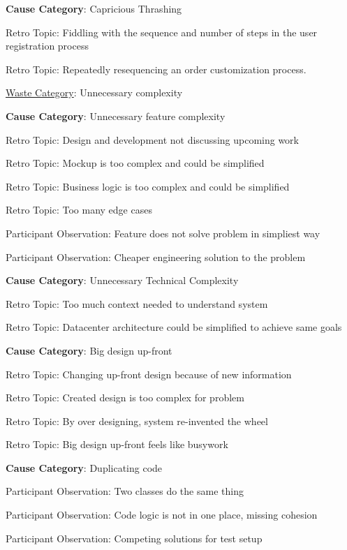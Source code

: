 \quad \textbf{Cause Category}: Capricious Thrashing

\quad \quad Retro Topic: Fiddling with the sequence and number of steps in the user registration process

\quad \quad Retro Topic: Repeatedly resequencing an order customization process.




\underline{Waste Category}: Unnecessary complexity

\quad \textbf{Cause Category}: Unnecessary feature complexity

\quad \quad Retro Topic: Design and development not discussing upcoming work

\quad \quad Retro Topic: Mockup is too complex and could be simplified

\quad \quad Retro Topic: Business logic is too complex and could be simplified

\quad \quad Retro Topic: Too many edge cases

\quad \quad Participant Observation: Feature does not solve problem in simpliest way

\quad \quad Participant Observation: Cheaper engineering solution to the  problem

\quad \textbf{Cause Category}: Unnecessary Technical Complexity

\quad \quad Retro Topic: Too much context needed to understand system

\quad \quad Retro Topic: Datacenter architecture could be simplified to achieve same goals

\quad \textbf{Cause Category}: Big design up-front

\quad \quad Retro Topic: Changing up-front design because of new information

\quad \quad Retro Topic: Created design is too complex for problem

\quad \quad Retro Topic: By over designing, system re-invented the wheel

\quad \quad Retro Topic: Big design up-front feels like busywork

\quad \textbf{Cause Category}: Duplicating code

\quad \quad Participant Observation: Two classes do the same thing

\quad \quad Participant Observation: Code logic is not in one place, missing cohesion

\quad \quad Participant Observation: Competing solutions for test setup

